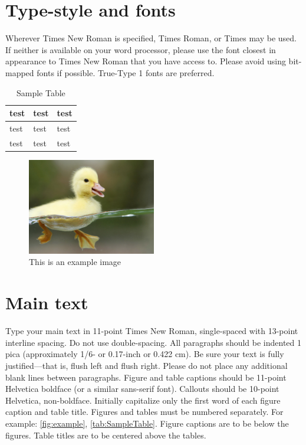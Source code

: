 \documentclass[11pt]{scrartcl}
\begin{document}
\section{Type-style and fonts}
Wherever Times New Roman is specified, Times Roman, or Times may be used. If neither is available on your word processor, please use the font closest in appearance to Times New Roman that you have access to. Please avoid using bit-mapped fonts if possible. True-Type 1 fonts are preferred.

\begin{table}[tbh]
	\caption{Sample Table}
	\centering
		\begin{tabular}{|l|l|l|}
				\hline
				test&test&test\\
				\hline
				test&test&test\\
				\hline
				test&test&test\\
				\hline
		\end{tabular}
	\label{tab:SampleTable}
\end{table}

\begin{figure}[tbh]
	\centering
		\includegraphics[width=0.50\textwidth]{Example.jpg}
	\caption{This is an example image}
	\label{fig:example}
\end{figure}

\section{Main text}
Type your main text in 11-point Times New Roman, single-spaced with 13-point interline spacing. Do not use double-spacing. All paragraphs should be indented 1 pica (approximately 1/6- or 0.17-inch or 0.422 cm). Be sure your text is fully justified—that is, flush left and flush right. Please do not place any additional blank lines between paragraphs. 
Figure and table captions should be 11-point Helvetica boldface (or a similar sans-serif font). Callouts should be 10-point Helvetica, non-boldface. Initially capitalize only the first word of each figure caption and table title. Figures and tables must be numbered separately. For example: \autoref{fig:example}, \autoref{tab:SampleTable}. Figure captions are to be below the figures. Table titles are to be centered above the tables.
\end{document}
